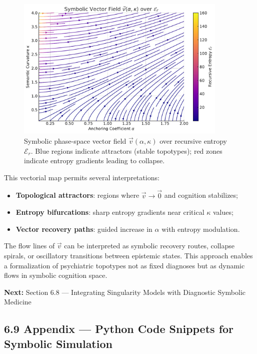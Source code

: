 \begin{figure}[H]
\centering
\includegraphics[width=0.9\textwidth]{figs/vector_field_symbolic_entropy.pdf}
\caption{Symbolic phase-space vector field $\vec{v}(\alpha, \kappa)$ over recursive entropy $\mathcal{E}_r$. Blue regions indicate attractors (stable topotypes); red zones indicate entropy gradients leading to collapse.}
\end{figure}

This vectorial map permits several interpretations:

\begin{itemize}
    \item \textbf{Topological attractors}: regions where $\vec{v} \to \vec{0}$ and cognition stabilizes;
    \item \textbf{Entropy bifurcations}: sharp entropy gradients near critical $\kappa$ values;
    \item \textbf{Vector recovery paths}: guided increase in $\alpha$ with entropy modulation.
\end{itemize}

The flow lines of $\vec{v}$ can be interpreted as symbolic recovery routes, collapse spirals, or oscillatory transitions between epistemic states. This approach enables a formalization of psychiatric topotypes not as fixed diagnoses but as dynamic flows in symbolic cognition space.

\bigskip
\noindent
\textbf{Next:} Section 6.8 — Integrating Singularity Models with Diagnostic Symbolic Medicine


\subsection*{6.9 Appendix — Python Code Snippets for Symbolic Simulation}

